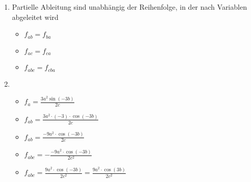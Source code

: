 \item
	\begin{enumerate}
	
	\item Partielle Ableitung sind unabhängig der Reihenfolge, in der nach Variablen abgeleitet wird
		\begin{itemize}
			\item $f_{ab} = f_{ba}$
			\item $f_{ac} = f_{ca}$
			\item $f_{abc} = f_{cba}$
		\end{itemize}
	
	\item
		\begin{itemize}
			\item $ f_a = \frac{3a^2\sin(-3b)}{2c}$
			\item $ f_{ab}= \frac{3a^2\cdot (-3) \cdot \cos(-3b)}{2c}$
			\item $ f_{ab}= \frac{-9a^2\cdot \cos(-3b)}{2c}$
			\item $ f_{abc}= -\frac{-9a^2\cdot \cos(-3b)}{2c^2}$
			\item $ f_{abc}= \frac{9a^2\cdot \cos(-3b)}{2c^2} = \frac{9a^2\cdot \cos(3b)}{2c^2}$
		\end{itemize}
		
	\end{enumerate}
